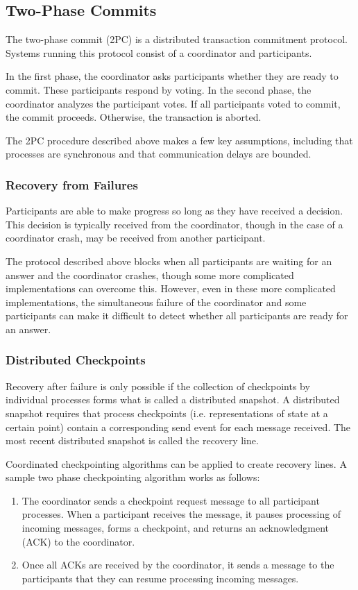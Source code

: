 \documentclass[12pt,titlepage]{article}
\begin{document}
    \subsection{Two-Phase Commits}
      The two-phase commit (2PC) is a distributed transaction commitment protocol. Systems running this protocol consist of a coordinator
      and participants.

      In the first phase, the coordinator asks participants whether they are ready to commit. These participants respond by voting. In the
      second phase, the coordinator analyzes the participant votes. If all participants voted to commit, the commit proceeds. Otherwise, the
      transaction is aborted.

      The 2PC procedure described above makes a few key assumptions, including that processes are synchronous and that communication delays are bounded.

      \subsubsection{Recovery from Failures}
        Participants are able to make progress so long as they have received a decision. This decision is typically received from the coordinator, though
        in the case of a coordinator crash, may be received from another participant.

        The protocol described above blocks when all participants are waiting for an answer and the coordinator crashes, though some more complicated
        implementations can overcome this. However, even in these more complicated implementations, the simultaneous failure of the coordinator and
        some participants can make it difficult to detect whether all participants are ready for an answer.

      \subsubsection{Distributed Checkpoints}
        Recovery after failure is only possible if the collection of checkpoints by individual processes forms what is called a distributed snapshot. A
        distributed snapshot requires that process checkpoints (i.e. representations of state at a certain point) contain a corresponding send event for
        each message received. The most recent distributed snapshot is called the recovery line.

        Coordinated checkpointing algorithms can be applied to create recovery lines. A sample two phase checkpointing algorithm works as follows:
        \begin{enumerate}
          \item The coordinator sends a checkpoint request message to all participant processes. When a participant receives the message, it pauses processing
            of incoming messages, forms a checkpoint, and returns an acknowledgment (ACK) to the coordinator.
          \item Once all ACKs are received by the coordinator, it sends a message to the participants that they can resume processing incoming messages.
        \end{enumerate}
\end{document}
